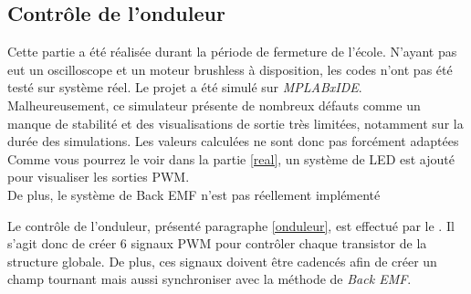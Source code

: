 			\subsection{Contrôle de l'onduleur}			
			\begin{tcolorbox}[center,width=0.9\textwidth, colframe=red!90!orange, colback=orange!25, arc=3mm,boxrule=1mm, sharp corners=east,title=Note]
			Cette partie a été réalisée durant la période de fermeture de l'école. N'ayant pas eut un oscilloscope et un moteur brushless à disposition, les codes n'ont pas été testé sur système réel. Le projet a été simulé sur \textit{MPLABxIDE}. Malheureusement, ce simulateur présente de nombreux défauts comme un manque de stabilité et des visualisations de sortie très limitées, notamment sur la durée des simulations. Les valeurs calculées ne sont donc pas forcément adaptées\\
  			Comme vous pourrez le voir dans la partie \ref{real}, un système de LED est ajouté pour visualiser les sorties PWM. 
  			\\De plus, le système de Back EMF n'est pas réellement implémenté
  			\end{tcolorbox}
  			Le contrôle de l'onduleur, présenté paragraphe \ref{onduleur}, est effectué par le \dspic . Il s'agit donc de créer 6 signaux  PWM pour contrôler chaque transistor de la structure globale. De plus, ces signaux doivent être cadencés afin de créer un champ tournant mais aussi synchroniser avec la méthode de \textit{Back EMF}.
